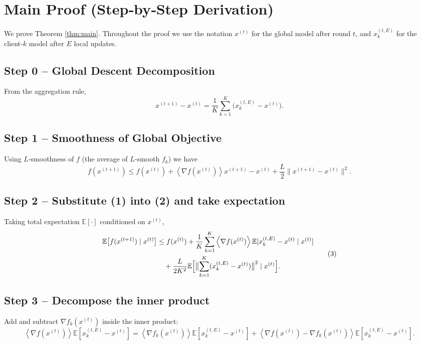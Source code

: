 \documentclass[11pt]{article}
\newcommand{\E}{\mathbb{E}}
\newcommand{\inner}[1]{\left\langle #1 \right\rangle}
\begin{document}
\section*{Main Proof (Step‑by‑Step Derivation)}
We prove Theorem \ref{thm:main}.  Throughout the proof we use the notation $x^{(t)}$ for the global model after round $t$, and $x_{k}^{(t,E)}$ for the client‑$k$ model after $E$ local updates.

\subsection*{Step 0 – Global Descent Decomposition}
From the aggregation rule,
\[
x^{(t+1)} - x^{(t)} = \frac{1}{K}\sum_{k=1}^{K}\bigl(x_{k}^{(t,E)}-x^{(t)}\bigr).
\tag{1}
\]

\subsection*{Step 1 – Smoothness of Global Objective}
Using $L$‑smoothness of $f$ (the average of $L$‑smooth $f_k$) we have
\[
f(x^{(t+1)}) \le f(x^{(t)}) + \inner{\nabla f(x^{(t)})}{x^{(t+1)}-x^{(t)}} + \frac{L}{2}\|x^{(t+1)}-x^{(t)}\|^{2}.
\tag{2}
\]

\subsection*{Step 2 – Substitute (1) into (2) and take expectation}
Taking total expectation $\E[\cdot]$ conditioned on $x^{(t)}$,
\[
\begin{aligned}
\E\bigl[f(x^{(t+1)})\mid x^{(t)}\bigr] 
&\le f(x^{(t)}) + \frac{1}{K}\sum_{k=1}^{K}\inner{\nabla f(x^{(t)})}{\E[x_{k}^{(t,E)}-x^{(t)}\mid x^{(t)}]} \\
&\quad +\frac{L}{2K^{2}}\E\Bigl[\bigl\|\sum_{k=1}^{K}(x_{k}^{(t,E)}-x^{(t)})\bigr\|^{2}\mid x^{(t)}\Bigr].
\end{aligned}
\tag{3}
\]

\subsection*{Step 3 – Decompose the inner product}
Add and subtract $\nabla f_k(x^{(t)})$ inside the inner product:
\[
\inner{\nabla f(x^{(t)})}{\E[x_{k}^{(t,E)}-x^{(t)}]}
=
\inner{\nabla f_k(x^{(t)})}{\E[x_{k}^{(t,E)}-x^{(t)}]}
+ \inner{\nabla f(x^{(t)})-\nabla f_k(x^{(t)})}{\E[x_{k}^{(t,E)}-x^{(t)}]} .
\tag{4}
\]
\end{document}
